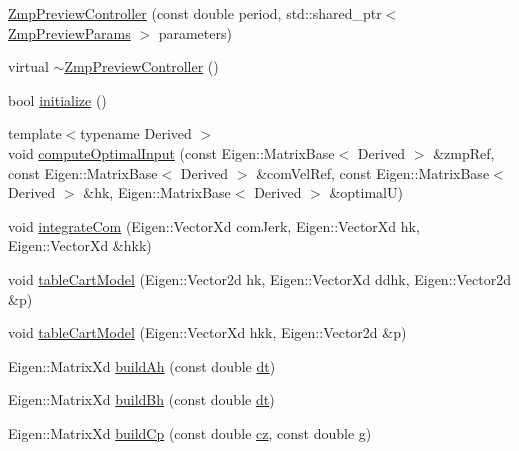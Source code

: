 \begin{DoxyCompactItemize}
\item 
\hyperlink{classZmpPreviewController_a26b5bd0bdd476f70c2009d77d5495b24}{\-Zmp\-Preview\-Controller} (const double period, std\-::shared\-\_\-ptr$<$ \hyperlink{structZmpPreviewParams}{\-Zmp\-Preview\-Params} $>$ parameters)
\item 
virtual \hyperlink{classZmpPreviewController_af702c45f318c7a78310d19cc061886dd}{$\sim$\-Zmp\-Preview\-Controller} ()
\item 
bool \hyperlink{classZmpPreviewController_ac28287e01187bff2cea5a68292d936bd}{initialize} ()
\item 
{\footnotesize template$<$typename Derived $>$ }\\void \hyperlink{classZmpPreviewController_aabdafde9ecc41a6d98134e0a01083d8a}{compute\-Optimal\-Input} (const \-Eigen\-::\-Matrix\-Base$<$ \-Derived $>$ \&zmp\-Ref, const \-Eigen\-::\-Matrix\-Base$<$ \-Derived $>$ \&com\-Vel\-Ref, const \-Eigen\-::\-Matrix\-Base$<$ \-Derived $>$ \&hk, \-Eigen\-::\-Matrix\-Base$<$ \-Derived $>$ \&optimal\-U)
\item 
void \hyperlink{classZmpPreviewController_abbf80c91182c5e41ce60d3b7430a583e}{integrate\-Com} (\-Eigen\-::\-Vector\-Xd com\-Jerk, \-Eigen\-::\-Vector\-Xd hk, \-Eigen\-::\-Vector\-Xd \&hkk)
\item 
void \hyperlink{classZmpPreviewController_a7d559ce7ece62627b58f20cd01c9ce30}{table\-Cart\-Model} (\-Eigen\-::\-Vector2d hk, \-Eigen\-::\-Vector\-Xd ddhk, \-Eigen\-::\-Vector2d \&p)
\item 
void \hyperlink{classZmpPreviewController_a7fa5d122b80650cdd9869b666e1ad597}{table\-Cart\-Model} (\-Eigen\-::\-Vector\-Xd hkk, \-Eigen\-::\-Vector2d \&p)
\item 
\-Eigen\-::\-Matrix\-Xd \hyperlink{classZmpPreviewController_a39ffdba07960f90a6cce247065f12504}{build\-Ah} (const double \hyperlink{classZmpPreviewController_abf1a3ec8d1698afab1c20bba32b5a724}{dt})
\item 
\-Eigen\-::\-Matrix\-Xd \hyperlink{classZmpPreviewController_a0114a8bdba920b9a7fb6b35e7b90ddd1}{build\-Bh} (const double \hyperlink{classZmpPreviewController_abf1a3ec8d1698afab1c20bba32b5a724}{dt})
\item 
\-Eigen\-::\-Matrix\-Xd \hyperlink{classZmpPreviewController_a716fdc040e5eaf9f6fe00c652f205d73}{build\-Cp} (const double \hyperlink{classZmpPreviewController_a3a317d26cc1bbaf8811491724fdd1def}{cz}, const double \hyperlink{classZmpPreviewController_a344571f012aa58250d7625905681bf1b}{g})

\end{DoxyCompactItemize}
